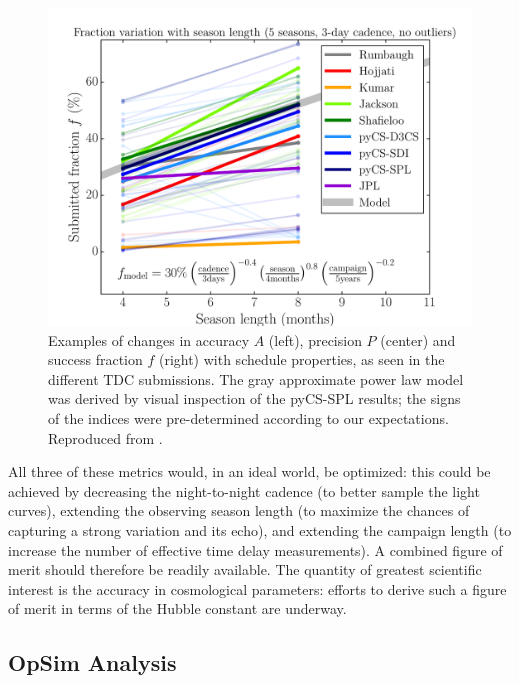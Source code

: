\begin{figure}[!ht]
\begin{minipage}[b]{\linewidth}
\begin{minipage}[b]{0.32\linewidth}
      \centering\includegraphics[width=\linewidth]{figs/Fraction_season_nca.pdf}
    \end{minipage}
  \end{minipage}
\caption{Examples of changes in accuracy $A$ (left), precision $P$ (center) and success fraction $f$ (right) with schedule properties, as seen in the different TDC submissions. The gray
approximate power law model was derived by visual inspection of the
pyCS-SPL results; the signs of the indices were pre-determined according to our expectations. Reproduced from \citet{LiaoEtal2015}.}
\label{fig:tdcresults}
\end{figure}

All three of these metrics would, in an ideal world, be optimized:
this could be achieved by decreasing the night-to-night cadence (to
better sample the light curves), extending the observing season length
(to maximize the chances of capturing a strong variation and its
echo), and extending the campaign length (to increase the number of
effective time delay measurements). A combined figure of merit should
therefore be readily available. The quantity of greatest scientific
interest is the accuracy in cosmological parameters: efforts to derive
such a figure of merit in terms of the Hubble constant are underway.


\subsection{OpSim Analysis}
\label{sec:\secname:analysis}

